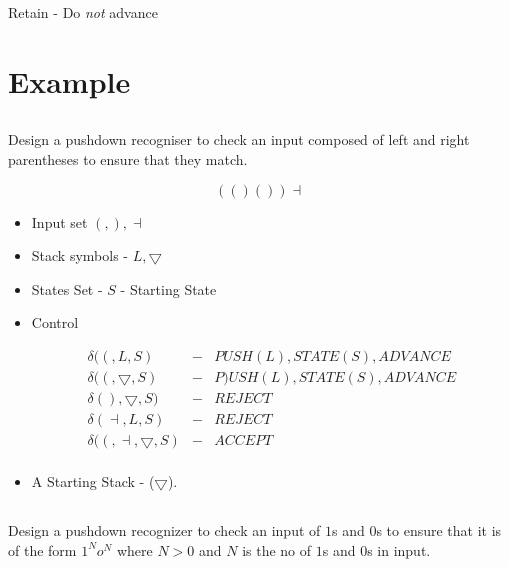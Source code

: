 \documentclass[a4paper,12pt]{article}
\begin{document}
Retain - Do \emph{not} advance

\section{Example}

\subsection{}

Design a pushdown recogniser to check an input composed of left and
right parentheses to ensure that they match.

\[ ( (  ) (  ) ) \dashv \]

\begin{itemize}

\item Input set ${(, ), \dashv }$

\item Stack symbols - ${L, \bigtriangledown}$

\item States Set - ${S}$ - Starting State

\item Control

\begin{eqnarray*}
\delta( (, L, S) & - & PUSH(L), STATE(S), ADVANCE \\
\delta( (, \bigtriangledown, S) & - & P)USH(L), STATE(S), ADVANCE \\
\delta( ), \bigtriangledown, S) & - & REJECT \\
\delta( \dashv, L, S) & - & REJECT \\
\delta( (, \dashv, \bigtriangledown, S) & - & ACCEPT \\
\end{eqnarray*}

\item A Starting Stack - ($\bigtriangledown$).

\end{itemize}


\subsection{}

Design a pushdown recognizer to check an input of $1$s and $0$s to
ensure that it is of the form $1^{N}o^{N}$ where $N > 0$ and $N$ is the
no of $1$s and $0$s in input.
\end{document}
